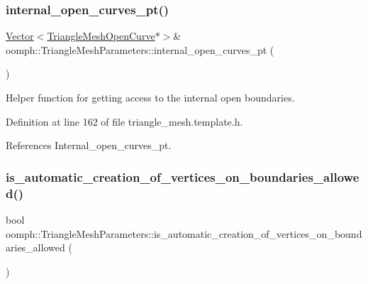 \subsubsection{\texorpdfstring{internal\+\_\+open\+\_\+curves\+\_\+pt()}{internal\_open\_curves\_pt()}\hspace{0.1cm}{\footnotesize\ttfamily [2/2]}}
{\footnotesize\ttfamily \hyperlink{classoomph_1_1Vector}{Vector}$<$\hyperlink{classoomph_1_1TriangleMeshOpenCurve}{Triangle\+Mesh\+Open\+Curve}$\ast$$>$\& oomph\+::\+Triangle\+Mesh\+Parameters\+::internal\+\_\+open\+\_\+curves\+\_\+pt (\begin{DoxyParamCaption}{ }\end{DoxyParamCaption})\hspace{0.3cm}{\ttfamily [inline]}}



Helper function for getting access to the internal open boundaries. 



Definition at line 162 of file triangle\+\_\+mesh.\+template.\+h.



References Internal\+\_\+open\+\_\+curves\+\_\+pt.

\mbox{\label{classoomph_1_1TriangleMeshParameters_a1c4b2e2d3d8831d46e42bd432fdcae32}} 
\subsubsection{\texorpdfstring{is\+\_\+automatic\+\_\+creation\+\_\+of\+\_\+vertices\+\_\+on\+\_\+boundaries\+\_\+allowed()}{is\_automatic\_creation\_of\_vertices\_on\_boundaries\_allowed()}}
{\footnotesize\ttfamily bool oomph\+::\+Triangle\+Mesh\+Parameters\+::is\+\_\+automatic\+\_\+creation\+\_\+of\+\_\+vertices\+\_\+on\+\_\+boundaries\+\_\+allowed (\begin{DoxyParamCaption}{ }\end{DoxyParamCaption})\hspace{0.3cm}{\ttfamily [inline]}}

